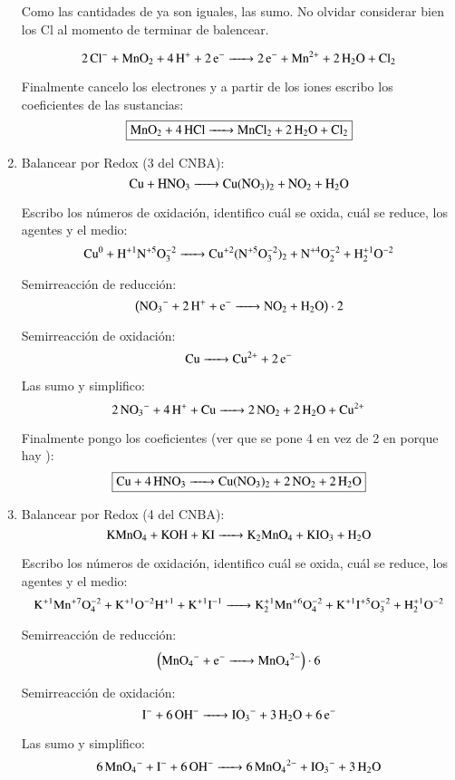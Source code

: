 \begin{enumerate}
Como las cantidades de  ya son iguales, las sumo. No olvidar considerar bien los Cl al momento de terminar de balencear.

$$\ce{2 Cl^- + MnO_2 + 4H^+ + 2e^- -> 2e^- + Mn^{2+} + 2H_2O + Cl_2}$$

Finalmente cancelo los electrones y a partir de los iones escribo los coeficientes de las sustancias:
$$\fbox{\ce{MnO_2 + 4HCl -> MnCl_2 + 2H_2O + Cl_2}}$$


\item
Balancear por Redox (3 del CNBA):
$$\ce{
Cu + HNO3 ->
Cu(NO3)2 + NO2 + H2O
}$$

Escribo los números de oxidación, identifico cuál se oxida, cuál se reduce, los agentes y el medio:
$$\ce{
Cu^0 + H^{+1}N^{+5}O^{-2}3 ->
Cu^{+2}(N^{+5}O^{-2}3)2 + N^{+4}O^{-2}2 + H^{+1}2O^{-2}
}$$


\begin{multicols}{2}
Semirreacción de reducción:
$$\left(\ce{
NO3^{-} + 2H^+ + e^- ->
NO2 + H2O
}\right)\cdot 2$$

Semirreacción de oxidación:
$$\ce{
Cu ->
Cu^{2+} + 2e^-
}$$
\end{multicols}

Las sumo y simplifico:
$$\ce{
2NO3^{-} + 4H^+ + Cu ->
2NO2 + 2 H2O + Cu^{2+}
}$$

Finalmente pongo los coeficientes (ver que se pone 4 en vez de 2 en  porque hay ):
$$\fbox{\ce{
Cu + 4HNO3 ->
Cu(NO3)2 + 2NO2 + 2H2O
}}$$


\newpage
\item
Balancear por Redox (4 del CNBA):
$$\ce{
KMnO4 + KOH + KI ->
K2MnO4 + KIO3 + H2O
}$$

Escribo los números de oxidación, identifico cuál se oxida, cuál se reduce, los agentes y el medio:
\[\ce{
K^{+1}Mn^{+7}O^{-2}4 + K^{+1}O^{-2}H^{+1} + K^{+1}I^{-1} ->
K^{+1}2Mn^{+6}O^{-2}4 + K^{+1}I^{+5}O^{-2}3 + H^{+1}2O^{-2}
}\]


\begin{multicols}{2}
Semirreacción de reducción:
$$\left(\ce{
MnO4^- +e^- ->
MnO4^{2-}
}\right)\cdot 6$$

Semirreacción de oxidación:
$$\ce{
I^{-} + 6OH^- ->
IO3^- + 3H2O + 6e^-
}$$
\end{multicols}

Las sumo y simplifico:
$$\ce{
6MnO4^- + I^- + 6OH^- ->
6MnO4^{2-} + IO3^- + 3H2O
}$$


\end{enumerate}
